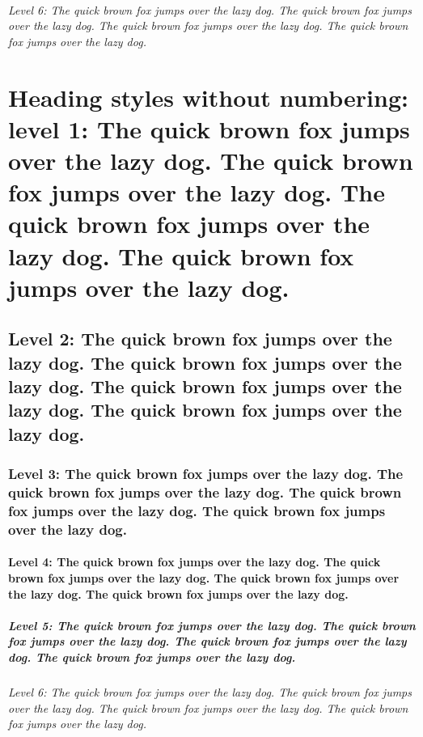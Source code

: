 \documentclass[9pt, twoside]{extreport}
\begin{document}
\lipsum[9-10]

\subparagraph{Level 6: The quick brown fox jumps over the lazy dog. The quick brown fox jumps over the lazy dog. The quick brown fox jumps over the lazy dog. The quick brown fox jumps over the lazy dog.}

\lipsum[11-12]



\chapter*{Heading styles without numbering: level 1: The quick brown fox jumps over the lazy dog. The quick brown fox jumps over the lazy dog. The quick brown fox jumps over the lazy dog. The quick brown fox jumps over the lazy dog.}
\section*{Level 2: The quick brown fox jumps over the lazy dog. The quick brown fox jumps over the lazy dog. The quick brown fox jumps over the lazy dog. The quick brown fox jumps over the lazy dog.}
\subsection*{Level 3: The quick brown fox jumps over the lazy dog. The quick brown fox jumps over the lazy dog. The quick brown fox jumps over the lazy dog. The quick brown fox jumps over the lazy dog.}
\subsubsection*{Level 4: The quick brown fox jumps over the lazy dog. The quick brown fox jumps over the lazy dog. The quick brown fox jumps over the lazy dog. The quick brown fox jumps over the lazy dog.}
\paragraph*{Level 5: The quick brown fox jumps over the lazy dog. The quick brown fox jumps over the lazy dog. The quick brown fox jumps over the lazy dog. The quick brown fox jumps over the lazy dog.}
\subparagraph*{Level 6: The quick brown fox jumps over the lazy dog. The quick brown fox jumps over the lazy dog. The quick brown fox jumps over the lazy dog. The quick brown fox jumps over the lazy dog.}
\end{document}
